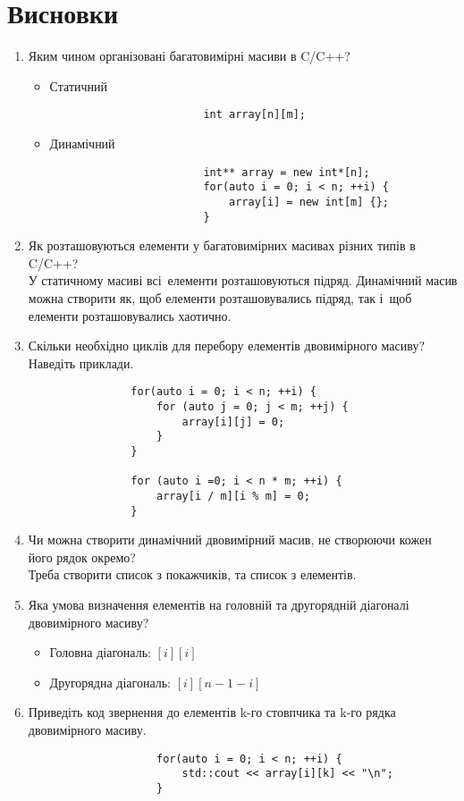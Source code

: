 \section{Висновки}
\label{sec:summary}

\begin{enumerate}
    \item Яким чином організовані багатовимірні масиви в C/C++?
          \begin{itemize}
              \item Статичний
                    \begin{verbatim}
                        int array[n][m];
                    \end{verbatim}
              \item Динамічний
                    \begin{verbatim}
                        int** array = new int*[n];
                        for(auto i = 0; i < n; ++i) {
                            array[i] = new int[m] {};
                        }
                    \end{verbatim}
          \end{itemize}
    \item Як розташовуються елементи у багатовимірних масивах різних типів в C/C++? \\
          У статичному масиві всі елементи розташовуються підряд.
          Динамічний масив можна створити як, щоб елементи розташовувались підряд,
          так і щоб елементи розташовувались хаотично.
    \item Скільки необхідно циклів для перебору елементів двовимірного масиву? Наведіть приклади.
          \begin{verbatim}
                for(auto i = 0; i < n; ++i) {
                    for (auto j = 0; j < m; ++j) {
                        array[i][j] = 0;
                    }
                }

                for (auto i =0; i < n * m; ++i) {
                    array[i / m][i % m] = 0;
                }
          \end{verbatim}
    \item Чи можна створити динамічний двовимірний масив, не створюючи кожен його рядок окремо? \\
          Треба створити список з покажчиків, та список з елементів.
    \item Яка умова визначення елементів на головній та другорядній діагоналі двовимірного масиву? \\
          \begin{itemize}
              \item Головна діагональ: $[i][i]$
              \item Другорядна діагональ: $[i][n - 1 - i]$
          \end{itemize}
    \item Приведіть код звернення до елементів k-го стовпчика та k-го рядка двовимірного масиву. \\
          \begin{verbatim}
                    for(auto i = 0; i < n; ++i) {
                        std::cout << array[i][k] << "\n";
                    }


\end{verbatim}
\end{enumerate}
